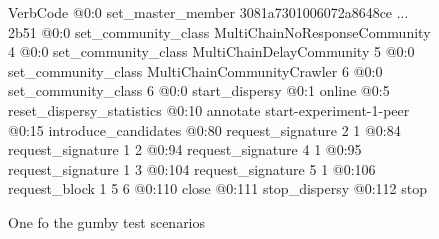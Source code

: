 \begin{figure}
    \begin{SaveVerbatim}{VerbCode}
@0:0 set_master_member 3081a7301006072a8648ce ... 2b51
@0:0 set_community_class MultiChainNoResponseCommunity {4}
@0:0 set_community_class MultiChainDelayCommunity {5}
@0:0 set_community_class MultiChainCommunityCrawler {6}
@0:0 set_community_class  {6}
@0:0 start_dispersy
@0:1 online
@0:5 reset_dispersy_statistics
@0:10 annotate start-experiment-1-peer
@0:15 introduce_candidates
@0:80 request_signature 2 {1}
@0:84 request_signature 1 {2}
@0:94 request_signature 4 {1}
@0:95 request_signature 1 {3}
@0:104 request_signature 5 {1}
@0:106 request_block 1 5 {6}
@0:110 close
@0:111 stop_dispersy
@0:112 stop
    \end{SaveVerbatim}
    \setlength{\fboxsep}{5mm}
    \caption{One fo the gumby test scenarios}
    \label{fig:exp-gumby-scenario}
\end{figure}